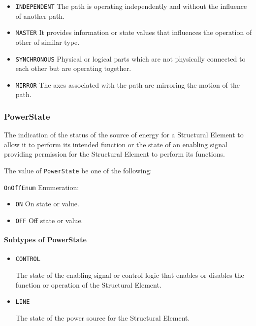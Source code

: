 \begin{itemize}
\item \texttt{INDEPENDENT} \newline The path is operating independently and without the influence of another path. 
\item \texttt{MASTER} \newline It provides information or state values that influences the operation of other  of similar type. 
\item \texttt{SYNCHRONOUS} \newline Physical or logical parts which are not physically connected to each other but are operating together. 
\item \texttt{MIRROR} \newline The axes associated with the path are mirroring the motion of the  path. 
\end{itemize}



\subsubsection{PowerState}
\label{sec:PowerState}



The indication of the status of the source of energy for a \gls{Structural Element} to allow it to perform its intended function or the state of an enabling signal providing permission for the \gls{Structural Element} to perform its functions.


The value of \texttt{PowerState} \MUST be one of the following: 


\texttt{OnOffEnum} Enumeration:

\begin{itemize}
\item \texttt{ON} \newline On state or value. 
\item \texttt{OFF} \newline Off state or value. 
\end{itemize}


\paragraph{Subtypes of PowerState}\mbox{}
\label{sec:Subtypes of PowerState}

\begin{itemize}

\item \texttt{CONTROL}


The state of the enabling signal or control logic that enables or disables the function or operation of the \gls{Structural Element}.

\item \texttt{LINE}


The state of the power source for the \gls{Structural Element}.


\end{itemize}





